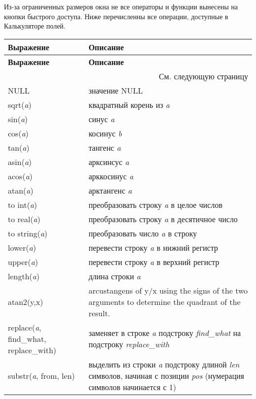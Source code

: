 Из-за ограниченных размеров окна не все операторы и функции вынесены на
кнопки быстрого доступа. Ниже перечисленны все операции, доступные в
Калькуляторе полей.

\begin{center}
{\setlength{\extrarowheight}{10pt}
\small
\begin{longtable}{|p{4cm}|p{10cm}|}
\hline \textbf{Выражение}&\textbf{Описание}\\
\endfirsthead
\hline \textbf{Выражение}&\textbf{Описание}\\
\endhead
\hline \multicolumn{2}{|r|}{{См. следующую страницу}} \\ \hline
\endfoot
\endlastfoot
\hline NULL & значение NULL \\
\hline sqrt(\textit{a}) & квадратный корень из \textit{a}\\
\hline sin(\textit{a}) & синус \textit{a} \\
\hline cos(\textit{a}) & косинус \textit{b} \\
\hline tan(\textit{a}) & тангенс \textit{a} \\
\hline asin(\textit{a}) & арксинсус \textit{a} \\
\hline acos(\textit{a}) & арккосинус \textit{a} \\
\hline atan(\textit{a}) & арктангенс \textit{a} \\
\hline to int(\textit{a}) & преобразовать строку \textit{a} в целое числов \\
\hline to real(\textit{a}) & преобразовать строку \textit{a} в десятичное число \\
\hline to string(\textit{a}) & преобразовать число \textit{a} в строку \\
\hline lower(\textit{a}) & перевести строку \textit{a} в нижний регистр \\
\hline upper(\textit{a}) & перевести строку \textit{a} в верхний регистр \\
\hline length(\textit{a}) & длина строки \textit{a} \\
\hline atan2(y,x) & arcustangens of y/x using the signs of the two arguments to determine the quadrant of the result. \\
\hline replace(\textit{a}, find\_what, replace\_with) & заменяет в строке \textit{a} подстроку \textit{find\_what} на подстроку \textit{replace\_with} \\
\hline substr(\textit{a}, from, len) & выделить из строки \textit{a} подстроку длиной \textit{len} символов, начиная с позиции \textit{pos} (нумерация символов начинается с 1) \\

\end{longtable}}
\end{center}
